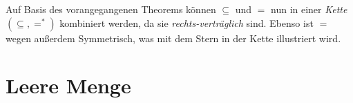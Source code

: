 \documentclass[main.tex]{subfiles}
\begin{document}
\begin{remark}
Auf Basis des vorangegangenen Theorems können \(\subseteq\) und \(=\) nun in einer \emph{Kette} \((\subseteq,=^{*})\) kombiniert werden,  da sie \emph{rechts-verträglich} sind. Ebenso ist \(=\) wegen  außerdem Symmetrisch, was mit dem Stern in der Kette illustriert wird.
\end{remark}

\chapter{Leere Menge}


\begin{tabproof}
\end{tabproof}

\begin{tabproof}
\end{tabproof}

\begin{tabproof}
\end{tabproof}
\end{document}
